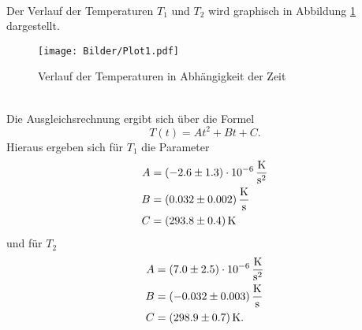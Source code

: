 \\
Der Verlauf der Temperaturen $T_1$ und $T_2$ wird graphisch in Abbildung
\ref{fig:T1T2} dargestellt.
\begin{figure}[h]
  \centering
  \texttt{[image: Bilder/Plot1.pdf]}
  \caption{Verlauf der Temperaturen in Abhängigkeit der Zeit}
  \label{fig:T1T2}
\end{figure}
\\
Die Ausgleichsrechnung ergibt sich über die Formel
\begin{equation*}
  T(t) = At^2+Bt+C.
\end{equation*}
Hieraus ergeben sich für $T_1$ die Parameter
\begin{align*}
  A &= (-2.6 \pm 1.3) \cdot10^{-6}\,\si{\kelvin\per\square\second} \\
  B &= (0.032 \pm 0.002) \,\si{\kelvin\per\second} \\
  C &= (293.8 \pm 0.4) \,\si{\kelvin}
\end{align*}
und für $T_2$
\begin{align*}
  A &= (7.0 \pm 2.5) \cdot 10^{-6} \,\si{\kelvin\per\square\second}\\
  B &= (-0.032 \pm 0.003)  \,\si{\kelvin\per\second} \\
  C &= (298.9 \pm 0.7) \,\si{\kelvin}.
\end{align*}

